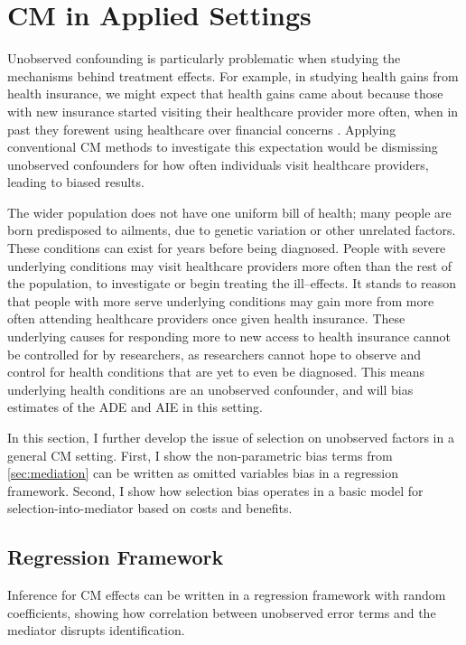 \section{CM in Applied Settings}
\label{sec:applied}
Unobserved confounding is particularly problematic when studying the mechanisms behind treatment effects.
For example, in studying health gains from health insurance, we might expect that health gains came about because those with new insurance started visiting their healthcare provider more often, when in past they forewent using healthcare over financial concerns \citep{finkelstein2008oregon}.
Applying conventional CM methods to investigate this expectation would be dismissing unobserved confounders for how often individuals visit healthcare providers, leading to biased results.

The wider population does not have one uniform bill of health; many people are born predisposed to ailments, due to genetic variation or other unrelated factors.
These conditions can exist for years before being diagnosed.
People with severe underlying conditions may visit healthcare providers more often than the rest of the population, to investigate or begin treating the ill--effects.
It stands to reason that people with more serve underlying conditions may gain more from more often attending healthcare providers once given health insurance.
These underlying causes for responding more to new access to health insurance cannot be controlled for by researchers, as researchers cannot hope to observe and control for health conditions that are yet to even be diagnosed.
This means underlying health conditions are an unobserved confounder, and will bias estimates of the ADE and AIE in this setting.

In this section, I further develop the issue of selection on unobserved factors in a general CM setting.
First, I show the non-parametric bias terms from \autoref{sec:mediation} can be written as omitted variables bias in a regression framework.
Second, I show how selection bias operates in a basic model for selection-into-mediator based on costs and benefits.

\subsection{Regression Framework}
\label{sec:regression}
Inference for CM effects can be written in a regression framework with random coefficients, showing how correlation between unobserved error terms and the mediator disrupts identification.

